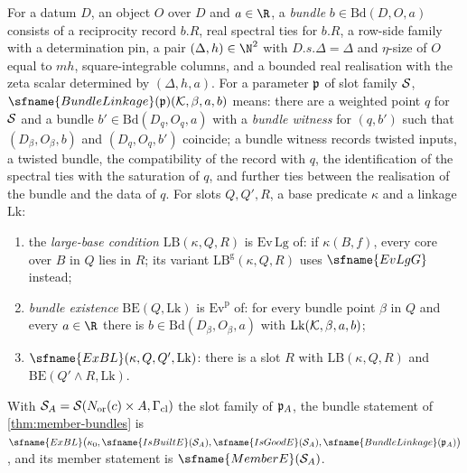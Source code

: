 \begin{definition}\label{pf:bundles:def:exbl}
For a datum $D$, an object $O$ over $D$ and $a\in\R$, a \emph{bundle} $b\in\mathrm{Bd}(D,O,a)$ consists of a reciprocity record
$b.R$, real spectral ties for $b.R$, a row-side family with a determination pin, a pair $(\Delta,h)\in\N^2$ with
$D.s.\Delta=\Delta$ and $\eta$-size of $O$ equal to $mh$, square-integrable columns, and a bounded real realisation with the zeta
scalar determined by $(\Delta,h,a)$. For a parameter $\mathfrak p$ of slot family $\mathcal S$, $\sfname{BundleLinkage}(\bundp)(\bundK,\beta,a,b)$
means: there are a weighted point $q$ for $\mathcal S$ and a bundle $b'\in\mathrm{Bd}(D_q,O_q,a)$ with a \emph{bundle witness} for
$(q,b')$ such that $(D_\beta,O_\beta,b)$ and $(D_q,O_q,b')$ coincide; a bundle witness records twisted inputs, a twisted bundle,
the compatibility of the record with $q$, the identification of the spectral ties with the saturation of $q$, and further ties
between the realisation of the bundle and the data of $q$. For slots $Q,Q',R$, a base predicate $\kappa$ and a linkage
$\mathrm{Lk}$:
\begin{enumerate}[label=(\alph*)]
\item the \emph{large-base condition} $\mathrm{LB}(\kappa,Q,R)$ is $\mathrm{Ev}\,\mathrm{Lg}$ of: if $\kappa(B,f)$, every core over
$B$ in $Q$ lies in $R$; its variant $\mathrm{LB}^{\mathrm g}(\kappa,Q,R)$ uses $\sfname{EvLgG}$ instead;
\item \emph{bundle existence} $\mathrm{BE}(Q,\mathrm{Lk})$ is $\mathrm{Ev}^{\mathrm p}$ of: for every bundle point $\beta$ in $Q$ and every
$a\in\R$ there is $b\in\mathrm{Bd}(D_\beta,O_\beta,a)$ with $\mathrm{Lk}(\mathcal K,\beta,a,b)$;
\item $\sfname{ExBL}(\kappa,Q,Q',\mathrm{Lk})$: there is a slot $R$ with $\mathrm{LB}(\kappa,Q,R)$ and $\mathrm{BE}(Q'\wedge R,\mathrm{Lk})$.
\end{enumerate}
With $\mathcal S_A=\mathcal S(N_{\mathrm{or}}(c)\times A,\Gamma_{\mathrm{cl}})$ the slot family of $\mathfrak p_A$, the bundle statement of
\cref{thm:member-bundles} is $\sfname{ExBL}\bigl(\kappa_0,\sfname{IsBuiltE}(\bundS_A),\sfname{IsGoodE}(\bundS_A),
\sfname{BundleLinkage}(\bundp_A)\bigr)$, and its member statement is $\sfname{MemberE}(\bundS_A)$.
\end{definition}

